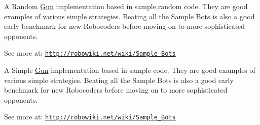 A Random \hyperlink{classmega_1_1boirlerplate_1_1_gun}{Gun} implementation based in sample.\+random code. They are good examples of various simple strategies. Beating all the Sample Bots is also a good early benchmark for new Robocoders before moving on to more sophisticated opponents.

See more at\+: \href{http://robowiki.net/wiki/Sample_Bots}{\tt http\+://robowiki.\+net/wiki/\+Sample\+\_\+\+Bots}

A Simple \hyperlink{classmega_1_1boirlerplate_1_1_gun}{Gun} implementation based in sample code. They are good examples of various simple strategies. Beating all the Sample Bots is also a good early benchmark for new Robocoders before moving on to more sophisticated opponents.

See more at\+: \href{http://robowiki.net/wiki/Sample_Bots}{\tt http\+://robowiki.\+net/wiki/\+Sample\+\_\+\+Bots} 